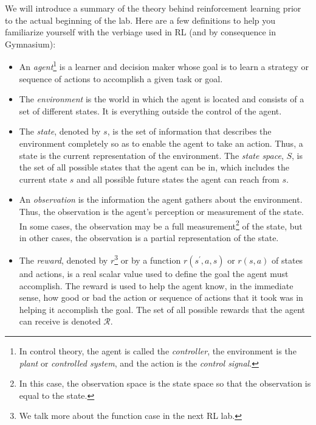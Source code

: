 We will introduce a summary of the theory behind reinforcement learning prior to the actual beginning of the lab.
Here are a few definitions to help you familiarize yourself with the verbiage used in RL (and by consequence in Gymnasium):
\begin{itemize}
    \item An \emph{agent}\footnote{In control theory, the agent is called the \emph{controller}, the environment is the \emph{plant} or \emph{controlled system}, and the action is the \emph{control signal}.} is a learner and decision maker whose goal is to learn a strategy or sequence of actions to accomplish a given task or goal.

    \item The \emph{environment} is the world in which the agent is located and consists of a set of different states.
    It is everything outside the control of the agent.

    \item The \emph{state}, denoted by $s$, is the set of information that describes the environment completely so as to enable the agent to take an action.
    Thus, a state is the current representation of the environment.
    The \emph{state space}, $S$, is the set of all possible states that the agent can be in, which includes the current state $s$ and all possible future states the agent can reach from $s$.

    \item An \emph{observation} is the information the agent gathers about the environment.
    Thus, the observation is the agent's perception or measurement of the state.
    In some cases, the observation may be a full measurement\footnote{In this case, the observation space is the state space so that the observation is equal to the state.} of the state, but in other cases, the observation is a partial representation of the state.

    \item The \emph{reward}, denoted by $r$\footnote{We talk more about the function case in the next RL lab.} or by a function $r(s^\prime,a,s)$ or $r(s,a)$ of states and actions, is a real scalar value used to define the goal the agent must accomplish.
    The reward is used to help the agent know, in the immediate sense, how good or bad the action or sequence of actions that it took was in helping it accomplish the goal.
    The set of all possible rewards that the agent can receive is denoted $\mathcal{R}$.


\end{itemize}
